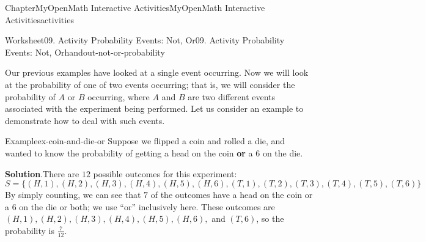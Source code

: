 \documentclass[oneside,10pt,]{book}
\newcommand{\blocktitlefont}{\relax}
\newcommand{\ptxlistdisc}{\raisebox{0.3ex}{\textbullet}}
\newcommand{\terminology}[1]{\textbf{#1}}
\newlength{\fillinmaxwidth}
\newlength{\fillincontract}
\newlength{\charmaxwidth}\setlength{\charmaxwidth}{0.5em}
\newlength{\charminwidth}\setlength{\charminwidth}{0.1em}
\newlength{\fillinheight}
\newcommand{\fillintext}[1]{%
\setlength{\fillinmaxwidth}{#1\charmaxwidth}%
\setlength{\fillincontract}{#1\charminwidth}%
\setlength{\fillinheight}{\baselineskip}\addtolength{\fillinheight}{1.2pt}%
\strut\nobreak\leaders\vbox{\hrule width 0.3pt height 0.3pt \vskip -1.2pt}\hskip 1\fillinmaxwidth minus \fillincontract\nobreak\strut%
}
\begin{document}
\begin{chapterptx}{Chapter}{MyOpenMath Interactive Activities}{}{MyOpenMath Interactive Activities}{}{}{activities}
\begin{worksheet-section}{Worksheet}{09. Activity Probability Events: Not, Or}{}{09. Activity Probability Events: Not, Or}{}{}{handout-not-or-probability}
%
%
\clearpage
Our previous examples have looked at a single event occurring. Now we will look at the probability of one of two events occurring; that is, we will consider the probability of \(A\) or \(B\) occurring, where \(A\) and \(B\) are two different events associated with the experiment being performed. Let us consider an example to demonstrate how to deal with such events.%
\begin{example}{Example}{}{ex-coin-and-die-or}%
Suppose we flipped a coin and rolled a die, and wanted to know the probability of getting a head on the coin \terminology{or} a 6 on the die.%
\par\smallskip%
\noindent\textbf{\blocktitlefont Solution}.\hypertarget{ex-coin-and-die-or-2}{}\quad{}There are \(12\) possible outcomes for this experiment:%
\begin{equation*}
S = \{(H,1), (H,2), (H,3), (H,4), (H,5), (H,6), (T,1), (T,2), (T,3), (T,4), (T,5), (T,6)\}
\end{equation*}
By simply counting, we can see that \(7\) of the outcomes have a head on the coin or a 6 on the die or both; we use \textquotedblleft{}or\textquotedblright{} inclusively here. These outcomes are \((H,1), (H,2), (H,3), (H,4), (H,5), (H,6),\) and \((T,6)\), so the probability is \(\frac{7}{12}\).%

\end{example}
\end{worksheet-section}
\end{chapterptx}
\end{document}
